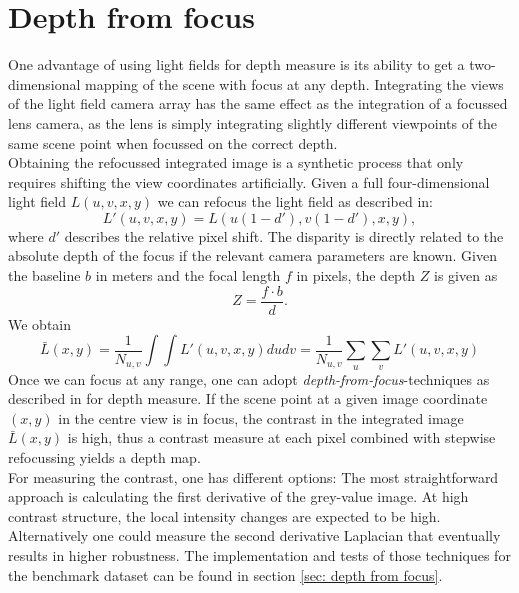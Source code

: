 \documentclass  [
  paper    = a4,
  BCOR     = 10mm,
  twoside,
  fontsize = 12pt,
  fleqn,
  toc      = bibnumbered,
  toc      = listofnumbered,
  numbers  = noendperiod,
  headings = normal,
  listof   = leveldown,
  version  = 3.03
]                                       {scrreprt}
\begin{document}
\section{Depth from focus}
\label{sec:theo depth}
One advantage of using light fields for depth measure is its ability to get a two-dimensional mapping of the scene with focus at any depth. Integrating the views of the light field camera array has the same effect as the integration of a focussed lens camera, as the lens is simply integrating slightly different viewpoints of the same scene point when focussed on the correct depth. \\
 Obtaining the refocussed integrated image is a synthetic process that only requires shifting the view coordinates artificially. Given a full four-dimensional light field $L(u, v, x, y)$ we can refocus the light field as described in\cite{ng2005light}:
 \begin{equation}\label{eq:refocus}
L'(u, v, x, y) = L(u(1-d'), v(1-d'), x, y),
\end{equation}
where $d'$ describes the relative pixel shift. The disparity is directly related to the absolute depth of the focus if the relevant camera parameters are known. Given the baseline $b$ in meters and the focal length $f$ in pixels, the depth $Z$ is given as \begin{equation}\label{key}
Z = \frac{f\cdot b}{d}.
\end{equation} 
We obtain
\begin{equation}\label{key}
\bar{L}(x,y) = \frac{1}{N_{u,v}}\int\int L'(u, v, x, y) du  dv =\frac{1}{N_{u,v}}\sum_{u}\sum_{v}  L'(u, v, x, y)
\end{equation}
Once we can focus at any range, one can adopt \textit{depth-from-focus}-techniques as described in \cite{watanabe1998rational} for depth measure. If the scene point at a given image coordinate $(x, y)$ in the centre view is in focus, the contrast in the integrated image $\bar{L}(x,y)$ is high, thus a contrast measure at each pixel combined with stepwise refocussing yields a depth map. \\
For measuring the contrast, one has different options: The most straightforward approach is calculating the first derivative of the grey-value image. At high contrast structure, the local intensity changes are expected to be high. Alternatively one could measure the second derivative Laplacian that eventually results in higher robustness. The implementation and tests of those techniques for the benchmark dataset can be found in section \ref{sec: depth from focus}.\\
\end{document}
